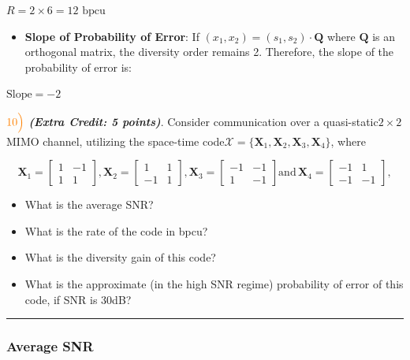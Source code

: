 \documentclass[11pt]{article}
\providecommand{\tightlist}{%
      \setlength{\itemsep}{0pt}\setlength{\parskip}{0pt}}
\begin{document}
\(R = 2 \times 6 = 12 \text{ bpcu}\)

\begin{itemize}
\tightlist
\item
  \textbf{Slope of Probability of Error}: If
  \((x_1, x_2) = (s_1, s_2) \cdot \mathbf{Q}\) where \(\mathbf{Q}\) is
  an orthogonal matrix, the diversity order remains 2. Therefore, the
  slope of the probability of error is:
\end{itemize}

\(\text{Slope} = -2\)

    \(\color{orange}10\Bigl)\) \textbf{\emph{(Extra Credit: 5 points)}}.
Consider communication over a quasi-static\(2 \times 2\)MIMO channel,
utilizing the space-time
code\(\mathcal{X} = \{\mathbf{X}_1,\mathbf{X}_2,\mathbf{X}_3,\mathbf{X}_4\}\),
where

\[
\mathbf{X}_1 =
\begin{bmatrix}
  1 & -1 \\
  1 & 1
\end{bmatrix},
\mathbf{X}_2 =
\begin{bmatrix}
  1 & 1 \\
  -1 & 1
\end{bmatrix},
\mathbf{X}_3 =
\begin{bmatrix}
  -1 & -1 \\
  1 & -1
\end{bmatrix}
\text{and} \,
\mathbf{X}_4 =
\begin{bmatrix}
  -1 & 1 \\
  -1 & -1
\end{bmatrix},
\]

\begin{itemize}
\tightlist
\item
  What is the average SNR?
\item
  What is the rate of the code in bpcu?
\item
  What is the diversity gain of this code?
\item
  What is the approximate (in the high SNR regime) probability of error
  of this code, if SNR is 30dB?
\end{itemize}

    \begin{center}\rule{0.5\linewidth}{0.5pt}\end{center}

\subsubsection{Average SNR}\label{average-snr}
\end{document}
